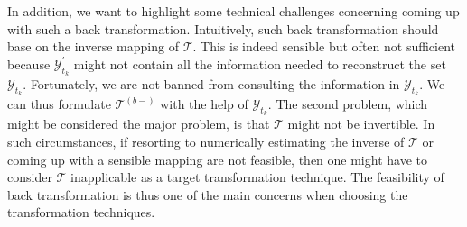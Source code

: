 In addition, we want to highlight some technical challenges concerning coming up with such a back transformation. Intuitively, such back transformation should base on the inverse mapping of $\mathcal{T}$. This is indeed sensible but often not sufficient because $\mathcal{Y}^{'}_{t_k}$ might not contain all the information needed to reconstruct the set $\mathcal{Y}_{t_k}$. Fortunately, we are not banned from consulting the information in $\mathcal{Y}_{t_k}$. We can thus formulate $\mathcal{T}^{(b-)}$ with the help of $\mathcal{Y}_{t_k}$. The second problem, which might be considered the major problem, is that $\mathcal{T}$ might not be invertible. In such circumstances, if resorting to numerically estimating the inverse of $\mathcal{T}$ or coming up with a sensible mapping are not feasible, then one might have to consider $\mathcal{T}$ inapplicable as a target transformation technique. The feasibility of back transformation is thus one of the main concerns when choosing the transformation techniques.

